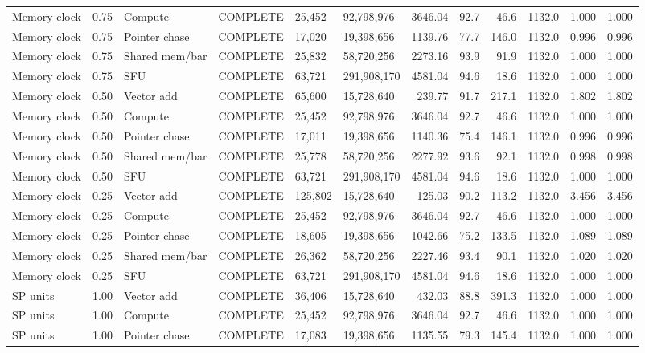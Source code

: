 \begin{landscape}
\begin{scriptsize}
\begin{longtable}{lllrllrrrrrr}
Memory clock & 0.75 & Compute & COMPLETE & 25,452 & 92,798,976 & 3646.04 & 92.7 & 46.6 & 1132.0 & 1.000 & 1.000 \\
Memory clock & 0.75 & Pointer chase & COMPLETE & 17,020 & 19,398,656 & 1139.76 & 77.7 & 146.0 & 1132.0 & 0.996 & 0.996 \\
Memory clock & 0.75 & Shared mem/bar & COMPLETE & 25,832 & 58,720,256 & 2273.16 & 93.9 & 91.9 & 1132.0 & 1.000 & 1.000 \\
Memory clock & 0.75 & SFU & COMPLETE & 63,721 & 291,908,170 & 4581.04 & 94.6 & 18.6 & 1132.0 & 1.000 & 1.000 \\
Memory clock & 0.50 & Vector add & COMPLETE & 65,600 & 15,728,640 & 239.77 & 91.7 & 217.1 & 1132.0 & 1.802 & 1.802 \\
Memory clock & 0.50 & Compute & COMPLETE & 25,452 & 92,798,976 & 3646.04 & 92.7 & 46.6 & 1132.0 & 1.000 & 1.000 \\
Memory clock & 0.50 & Pointer chase & COMPLETE & 17,011 & 19,398,656 & 1140.36 & 75.4 & 146.1 & 1132.0 & 0.996 & 0.996 \\
Memory clock & 0.50 & Shared mem/bar & COMPLETE & 25,778 & 58,720,256 & 2277.92 & 93.6 & 92.1 & 1132.0 & 0.998 & 0.998 \\
Memory clock & 0.50 & SFU & COMPLETE & 63,721 & 291,908,170 & 4581.04 & 94.6 & 18.6 & 1132.0 & 1.000 & 1.000 \\
Memory clock & 0.25 & Vector add & COMPLETE & 125,802 & 15,728,640 & 125.03 & 90.2 & 113.2 & 1132.0 & 3.456 & 3.456 \\
Memory clock & 0.25 & Compute & COMPLETE & 25,452 & 92,798,976 & 3646.04 & 92.7 & 46.6 & 1132.0 & 1.000 & 1.000 \\
Memory clock & 0.25 & Pointer chase & COMPLETE & 18,605 & 19,398,656 & 1042.66 & 75.2 & 133.5 & 1132.0 & 1.089 & 1.089 \\
Memory clock & 0.25 & Shared mem/bar & COMPLETE & 26,362 & 58,720,256 & 2227.46 & 93.4 & 90.1 & 1132.0 & 1.020 & 1.020 \\
Memory clock & 0.25 & SFU & COMPLETE & 63,721 & 291,908,170 & 4581.04 & 94.6 & 18.6 & 1132.0 & 1.000 & 1.000 \\
SP units & 1.00 & Vector add & COMPLETE & 36,406 & 15,728,640 & 432.03 & 88.8 & 391.3 & 1132.0 & 1.000 & 1.000 \\
SP units & 1.00 & Compute & COMPLETE & 25,452 & 92,798,976 & 3646.04 & 92.7 & 46.6 & 1132.0 & 1.000 & 1.000 \\
SP units & 1.00 & Pointer chase & COMPLETE & 17,083 & 19,398,656 & 1135.55 & 79.3 & 145.4 & 1132.0 & 1.000 & 1.000 \\

\end{longtable}
\end{scriptsize}
\end{landscape}
